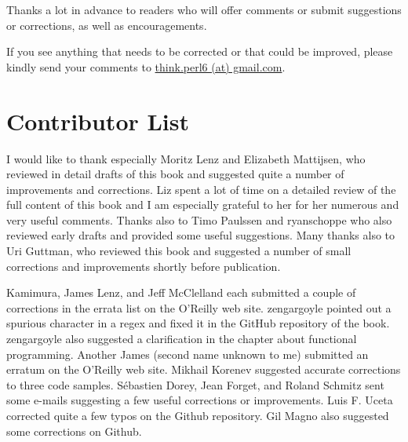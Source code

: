 Thanks a lot in advance to readers who will offer comments 
or submit suggestions or corrections, as well as encouragements.

If you see anything that needs to be corrected or that 
could be improved, please kindly send your comments to 
\url{think.perl6 (at) gmail.com}.


\section*{Contributor List}

I would like to thank especially Moritz Lenz and Elizabeth 
Mattijsen, who reviewed in detail drafts of this book 
and suggested quite a number of improvements and corrections. Liz 
spent a lot of time on a detailed review of the full 
content of this book and I am especially grateful to her for 
her numerous and very useful comments. Thanks also to Timo Paulssen and 
ryanschoppe who also reviewed early drafts and provided some  
useful suggestions. Many thanks also to Uri Guttman, who reviewed 
this book and suggested a number of small corrections and improvements 
shortly before publication. 

Kamimura, James Lenz, and Jeff McClelland each submitted a couple 
of corrections in the errata list on the O'Reilly web site.
zengargoyle pointed out a spurious character in a regex 
and fixed it in the GitHub repository of the book. zengargoyle
also suggested a clarification in the chapter about functional 
programming. Another James (second name unknown to me) 
submitted an erratum on the O'Reilly web site. Mikhail Korenev 
suggested accurate corrections to three code samples.  
Sébastien Dorey, Jean Forget, and Roland Schmitz sent some e-mails 
suggesting a few useful corrections or improvements.
Luis F. Uceta corrected quite a few typos on the Github repository. 
Gil Magno also suggested some corrections on Github.

\clearemptydoublepage

\begin{latexonly}

\tableofcontents

\clearemptydoublepage

\end{latexonly}


